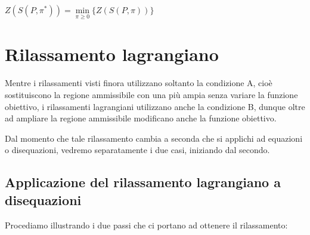 \documentclass[11pt]{book}
\begin{document}
\begin{center}
$Z(S(P,\pi^*)) = \min\limits_{\pi \geq 0}\{ Z(S(P,\pi))\}$  
\end{center}

\section{Rilassamento lagrangiano}

Mentre i rilassamenti visti finora utilizzano soltanto la condizione
A, cio\`e sostituiscono la regione ammissibile con una pi\`u ampia
senza variare la funzione obiettivo, i rilassamenti lagrangiani
utilizzano anche la condizione B, dunque oltre ad ampliare la regione
ammissibile modificano anche la funzione obiettivo.

Dal momento che tale rilassamento cambia a seconda che si applichi ad
equazioni o disequazioni, vedremo separatamente i due casi, iniziando
dal secondo.

\subsection{Applicazione del rilassamento lagrangiano a disequazioni}

Procediamo illustrando i due passi che ci portano ad ottenere il
rilassamento:
\end{document}
